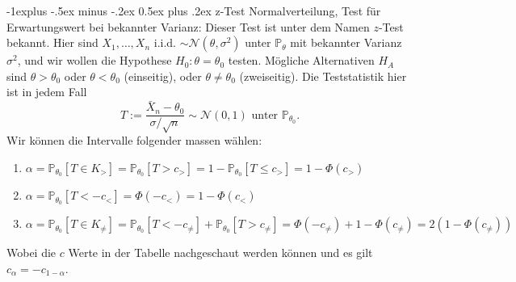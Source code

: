 \documentclass[10pt,landscape]{article}
\makeatletter
\renewcommand{\subsection}{\@startsection{subsection}{1}{0mm}%
                                {-1ex plus -.5ex minus -.2ex}%
                                {0.5ex plus .2ex}%
                                {\normalfont\large\bfseries}}
\renewcommand{\subsection}{\@startsection{subsection}{2}{0mm}%
                                {-1explus -.5ex minus -.2ex}%
                                {0.5ex plus .2ex}%
                                {\normalfont\normalsize\bfseries}}
\makeatother
\begin{document}
\begin{multicols}{3}
\subsection{z-Test}
Normalverteilung, Test für Erwartungswert bei bekannter Varianz: Dieser Test ist unter dem Namen $z$-Test bekannt. Hier sind $X_{1}, \ldots, X_{n}$ i.i.d. $\sim \mathcal{N}\left(\theta, \sigma^{2}\right)$ unter $\mathbb{P}_{\theta}$ mit bekannter Varianz $\sigma^{2}$, und wir wollen die Hypothese $H_{0}: \theta=\theta_{0}$ testen. 
Mögliche Alternativen $H_{A}$ sind $\theta>\theta_{0}$ oder $\theta<\theta_{0}$ (einseitig), oder $\theta \neq \theta_{0}$ (zweiseitig). 
Die Teststatistik hier ist in jedem Fall
$$
T:=\frac{\bar{X}_{n}-\theta_{0}}{\sigma / \sqrt{n}} \sim \mathcal{N}(0,1) \text { unter } \mathbb{P}_{\theta_{0}}.
$$
Wir können die Intervalle folgender massen wählen:
\begin{enumerate}
    \item $\alpha=\mathbb{P}_{\theta_{0}}\left[T \in K_{>}\right]=\mathbb{P}_{\theta_{0}}\left[T>c_{>}\right]=1-\mathbb{P}_{\theta_{0}}\left[T \leq c_{>}\right]=1-\Phi\left(c_{>}\right)$
    \item $\alpha=\mathbb{P}_{\theta_{0}}\left[T< - c_{<}\right]=\Phi\left( - c_{<}\right) = 1 - \Phi\left(c_{<}\right)$ 
    \item $\alpha=\mathbb{P}_{\theta_{0}}\left[T \in K_{\neq}\right]=\mathbb{P}_{\theta_{0}}\left[T<-c_{\neq}\right]+\mathbb{P}_{\theta_{0}}\left[T>c_{\neq}\right]=\Phi\left(-c_{\neq}\right)+1-\Phi\left(c_{\neq}\right)=2\left(1-\Phi\left(c_{\neq}\right)\right)$
\end{enumerate}
Wobei die $c$ Werte in der Tabelle nachgeschaut werden können und es gilt $c_{\alpha}=-c_{1-\alpha}$.

\end{multicols}
\end{document}
